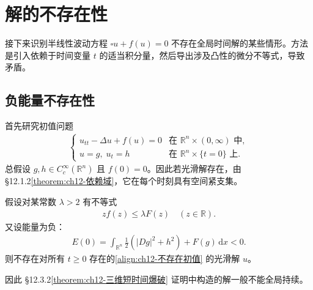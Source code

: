 \documentclass[../../main.tex]{subfiles}
\begin{document}
\section{解的不存在性}\label{section:ch12-解的不存在性}

接下来识别半线性波动方程 $\square u+f(u)=0$ 不存在全局时间解的某些情形。方法是引入依赖于时间变量 $t$ 的适当积分量，然后导出涉及凸性的微分不等式，导致矛盾。

\subsection{负能量不存在性}\label{subsection:ch12-负能量不存在}

首先研究初值问题
\begin{align}
\begin{cases}
u_{tt}-\Delta u+f(u)=0 & \text{在 } \mathbb{R}^n\times(0,\infty) \text{ 中},\\
u=g,\;u_t=h & \text{在 } \mathbb{R}^n\times\{t=0\} \text{ 上}.
\end{cases}
\label{align:ch12-不存在初值}
\end{align}
总假设 $g,h\in C_c^\infty(\mathbb{R}^n)$ 且 $f(0)=0$。因此若光滑解存在，由 \S12.1.2\cref{theorem:ch12-依赖域}，它在每个时刻具有空间紧支集。

\begin{theorem}[负能量不存在性。]\label{theorem:ch12-负能量不存在}假设对某常数 $\lambda>2$ 有不等式
\begin{align}
zf(z)\leqslant\lambda F(z) \quad (z\in\mathbb{R}).
\label{align:ch12-zf不等式}
\end{align}
又设能量为负：
\begin{align}
E(0)=\int_{\mathbb{R}^n}\frac{1}{2}(|Dg|^2+h^2)+F(g)\,\mathrm{d}x<0.
\label{align:ch12-负初始能量}
\end{align}
则不存在对所有 $t\geqslant 0$ 存在的\eqref{align:ch12-不存在初值} 的光滑解 $u$。

因此 \S12.3.2\cref{theorem:ch12-三维短时间爆破} 证明中构造的解一般不能全局持续。
\end{theorem}
\end{document}
